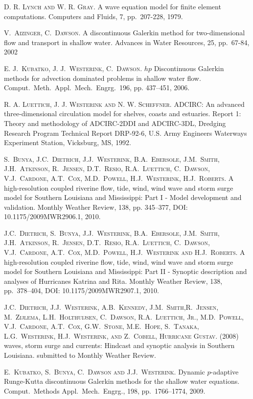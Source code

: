 
\begin{thebibliography}{10}
\textsc{D. R. Lynch and W. R. Gray}. {A wave equation model for finite element computations}. Computers and Fluids, 7, pp.\ 207-228, 1979.  

\textsc{V.~Aizinger, C.~Dawson}. {A discontinuous Galerkin method for two-dimensional flow and transport in shallow water}. Advances in Water Resources, 25, pp.\ 67-84, 2002

\textsc{E. J.~Kubatko, J. J.~Westerink, C.~Dawson}. {$hp$ Discontinuous Galerkin methods for advection dominated problems in shallow water flow}. Comput.~Meth.~Appl.~Mech.~Engrg.~196, pp. 437--451, 2006.

\textsc{R. A. Luettich, J. J. Westerink and N. W. Scheffner}. {ADCIRC: An advanced three-dimensional circulation model for shelves, coasts and estuaries}. Report 1: Theory and methodology of ADCIRC-2DDI and ADCIRC-3DL, Dredging Research Program Technical Report DRP-92-6, U.S. Army Engineers Waterways Experiment Station, Vicksburg, MS, 1992.

\textsc{S.~Bunya, J.C.~Dietrich, J.J.~Westerink, B.A.~Ebersole, J.M.~Smith,  J.H.~Atkinson, R.~Jensen, D.T.~Resio, R.A.~Luettich, C.~Dawson, V.J.~Cardone, A.T.~Cox, M.D.~Powell, H.J.~Westerink, H.J.~Roberts}. {A high-resolution coupled riverine flow, tide, wind, wind wave and storm surge model for Southern Louisiana and Mississippi: Part I - Model development and validation}. Monthly Weather Review, 138, pp. 345--377, DOI: 10.1175/2009MWR2906.1, 2010.  

\textsc{J.C.~Dietrich, S.~Bunya, J.J.~Westerink, B.A.~Ebersole, J.M.~Smith,  J.H.~Atkinson, R.~Jensen, D.T.~Resio, R.A.~Luettich, C.~Dawson, V.J.~Cardone, A.T.~Cox, M.D.~Powell, H.J.~Westerink and H.J.~Roberts}. {A high-resolution coupled riverine flow, tide, wind, wind wave and storm surge model for Southern Louisiana and Mississippi: Part II - Synoptic description and analyses of Hurricanes Katrina and Rita}. Monthly Weather Review, 138, pp.\ 378--404, DOI: 10.1175/2009MWR2907.1, 2010.

\textsc{J.C.~Dietrich, J.J.~Westerink, A.B.~Kennedy, J.M.~Smith,R.~Jensen, M.~Zijlema, L.H.~Holthuijsen, C.~Dawson, R.A.~Luettich, Jr., M.D.~Powell, V.J.~Cardone, A.T.~Cox, G.W.~Stone, M.E.~Hope, S.~Tanaka, L.G.~Westerink, H.J.~Westerink, and Z.~Cobell, Hurricane Gustav}. {(2008) waves, storm surge and currents:  Hindcast and synoptic analysis in Southern Louisiana}. submitted to Monthly Weather Review.

\textsc{E.~Kubatko, S.~Bunya, C.~Dawson and J.J.~Westerink}. {Dynamic $p$-adaptive Runge-Kutta discontinuous Galerkin methods for the shallow water equations}. Comput.~Methods Appl.~Mech.~Engrg., 198, pp.\ 1766--1774, 2009.
\end{thebibliography}